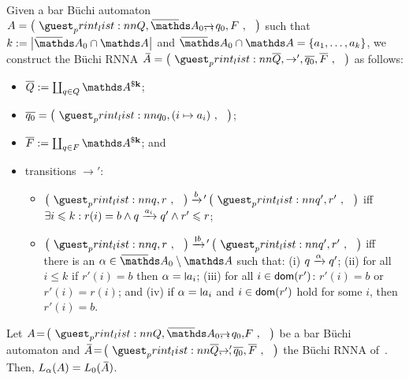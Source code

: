 \documentclass[a4paper,UKenglish,cleveref,autoref,thm-restate,numberwithinsect,final]{lipics-v2021}
\begin{document}
    \begin{construction}\label{constr:Buechi}
      \sloppypar
      Given a bar Büchi automaton $A = \maketuple{Q, \barNames_0,\!\!\!\to\!\!, q_0, F}$ such
      that 
      ${k := \card{\barNames_0 \cap \names}}$ and $\barNames_0 \cap \names = \set{a_1, \dots, a_k}$,
      we construct the Büchi RNNA $\barA = \maketuple{\overline{Q}, \to', \overline{q_0}, \overline{F}}$
      as follows:
      \begin{itemize}
        \item $\overline{Q} := \coprod_{q \in Q} \parnom{k}$;
        \item $\overline{q_0} = \maketuple{q_0, (i \mapsto a_i)}$;
        \item $\overline{F} := \coprod_{q \in F} \parnom{k}$; and
        \item transitions $\to'$:
        \begin{itemize}
          \item $\maketuple{q, r} \xra{b}\!'{}\, \maketuple{q', r'}$ iff
            $\exists i \leqslant k: r(i) = b \wedge q \xrightarrow{a_i} q' \wedge r' \leqslant r$;
          \item $\maketuple{q, r} \xra{\scriptnew{b}}\!'{}\, \maketuple{q', r'}$ iff
            there is an $\alpha \in \barNames_0\setminus\names$ such that: (i) $q \xrightarrow{\alpha} q'$;
            (ii) for all $i \leqslant k$ if $r'(i) = b$ then $\alpha = \newletter{a_i}$;
            (iii) for all $i \in \operatorname{\textsf{dom}}(r')$: $r'(i) = b$ or $r'(i) = r(i)$; and
            (iv) if $\alpha = \newletter{a_i}$ and $i \in \operatorname{\textsf{dom}}(r')$ hold for some $i$, then $r'(i) = b$.
        \end{itemize}
      \end{itemize}
    \end{construction}
    \begin{proposition}\label{prop:APPA}
      Let $A\!=\!\maketuple{Q, \barNames_0,\!\!\!\to\!\!, q_0,\!F}$ be a bar Büchi automaton and
      $\barA\!=\!\maketuple{\overline{Q},\!\!\!\to'\!\!, \overline{q_0}, \overline{F}}$ the Büchi RNNA
      of~. Then, $L_\alpha(A) = L_0(\barA)$.
    \end{proposition}
\end{document}
